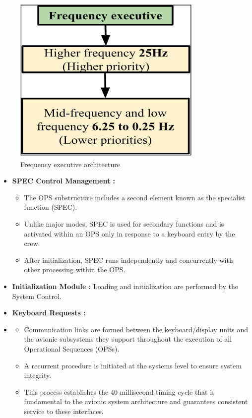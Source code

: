 \documentclass[a4paper,11pt]{article}%
\newenvironment{qanda}{\setlength{\parindent}{0pt}}{\bigskip}
\begin{document}
\begin{qanda}
\begin{enumerate}
\begin{enumerate}
				      \begin{figure}[H]
					      \centering
					      \includegraphics[scale=0.7]{figures/ce2.png}
					      \caption{Frequency executive architecture}
				      \end{figure}

				      \begin{itemize}
					      \item \textbf{SPEC Control Management :}
					            \begin{itemize}
						            \item The OPS substructure includes a second element known as the specialist function (SPEC).
						            \item Unlike major modes, SPEC is used for secondary functions and is activated within an OPS only in
						                  response to a keyboard entry by the crew.
						            \item After initialization, SPEC runs independently and concurrently with other processing within the OPS.
					            \end{itemize}

					      \item \textbf{Initialization Module :} Loading and initialization are performed by the System Control.
					      \item \textbf{Keyboard Requests :}
					      \item \begin{itemize}
						            \item Communication links are formed between the keyboard/display units and the avionic subsystems they
						                  support throughout the execution of all Operational Sequences (OPSs).
						            \item A recurrent procedure is initiated at the systems level to ensure system integrity.
						            \item This process establishes the 40-millisecond timing cycle that is fundamental to the avionic system
						                  architecture and guarantees consistent service to these interfaces.
					            \end{itemize}


\end{itemize}
\end{enumerate}
\end{enumerate}
\end{qanda}
\end{document}
